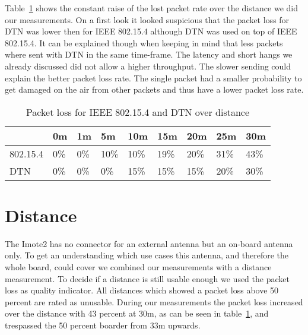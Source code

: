 Table~\ref{tableloss} shows the constant raise of the lost packet rate over the
distance we did our measurements. On a first look it looked suspicious that the
packet loss for DTN was lower then for IEEE 802.15.4 although DTN was used on top
of IEEE 802.15.4. It can be explained though when keeping in mind that less
packets where sent with DTN in the same time-frame. The latency and short hangs
we already discussed did not allow a higher throughput. The slower sending could
explain the better packet loss rate. The single packet had a smaller probability
to get damaged on the air from other packets and thus have a lower packet loss
rate.

\begin{table}
\begin{tabular}{lllllllll}
    & 0m & 1m & 5m & 10m & 15m & 20m & 25m & 30m \\
\hline
802.15.4 & 0\% & 0\% & 10\% & 10\% & 19\% & 20\% & 31\% & 43\% \\
DTN & 0\% & 0\% & 0\% & 15\% & 15\% & 15\% & 20\% & 30\% \\
\end{tabular}
\caption{Packet loss for IEEE 802.15.4 and DTN over distance}
\label{tableloss}
\end{table}

\section{Distance}
The Imote2 has no connector for an external antenna but an on-board antenna
only. To get an understanding which use cases this antenna, and therefore the
whole board, could cover we combined our measurements with a distance
measurement. To decide if a distance is still usable enough we used the
packet loss as quality indicator. All distances which showed a packet loss above
50 percent are rated as unusable. During our measurements the packet loss
increased over the distance with 43 percent at 30m, as can be seen in table~\ref{tableloss}, and trespassed the 50 percent boarder from 33m upwards.

